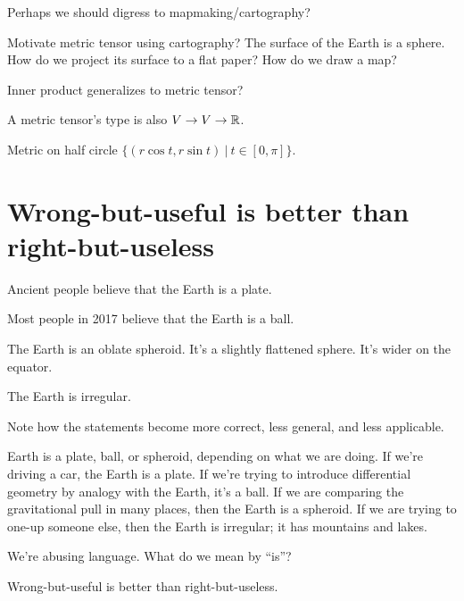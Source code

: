 Perhaps we should digress to mapmaking/cartography?

Motivate metric tensor using cartography?
The surface of the Earth is a sphere.
How do we project its surface to a flat paper?
How do we draw a map?

Inner product generalizes to metric tensor?

A metric tensor's type is also \( V \to V \to \mathbb{R} \).

Metric on half circle \( \{ (r \cos t, r \sin t) ~|~ t \in [0,\pi] \} \).

\section{Wrong-but-useful is better than right-but-useless}

Ancient people believe that the Earth is a plate.

Most people in 2017 believe that the Earth is a ball.

The Earth is an oblate spheroid.
It's a slightly flattened sphere.
It's wider on the equator.

The Earth is irregular.

Note how the statements become more correct, less general, and less applicable.

Earth is a plate, ball, or spheroid, depending on what we are doing.
If we're driving a car, the Earth is a plate.
If we're trying to introduce differential geometry by analogy with the Earth, it's a ball.
If we are comparing the gravitational pull in many places,
then the Earth is a spheroid.
If we are trying to one-up someone else, then the Earth is irregular;
it has mountains and lakes.

We're abusing language.
What do we mean by \enquote{is}?

Wrong-but-useful is better than right-but-useless.
